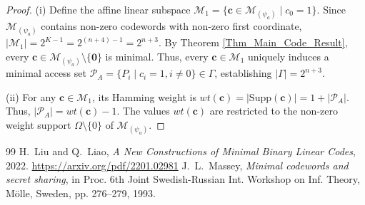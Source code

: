 \documentclass[10pt,a4paper]{amsart}
\begin{document}
\begin{proof}
(i) Define the affine linear subspace $\mathcal{M}_1 = \{\mathbf{c} \in \mathcal{M}_{(\psi_a)} \mid c_0 = 1\}$. Since $\mathcal{M}_{(\psi_a)}$ contains non-zero codewords with non-zero first coordinate, $|\mathcal{M}_1| = 2^{K-1} = 2^{(n+4)-1} = 2^{n+3}$. By Theorem \ref{Thm_Main_Code_Result}, every $\mathbf{c} \in \mathcal{M}_{(\psi_a)} \setminus \{\mathbf{0}\}$ is minimal. Thus, every $\mathbf{c} \in \mathcal{M}_1$ uniquely induces a minimal access set $\mathcal{P}_A = \{P_i \mid c_i = 1, i \neq 0\} \in \Gamma$, establishing $|\Gamma| = 2^{n+3}$.

(ii) For any $\mathbf{c} \in \mathcal{M}_1$, its Hamming weight is $wt(\mathbf{c}) = |\mathrm{Supp}(\mathbf{c})| = 1 + |\mathcal{P}_A|$. Thus, $|\mathcal{P}_A| = wt(\mathbf{c}) - 1$. The values $wt(\mathbf{c})$ are restricted to the non-zero weight support $\Omega \setminus \{0\}$ of $\mathcal{M}_{(\psi_a)}$.
\end{proof}


\begin{thebibliography}{99}
 H.~Liu and Q.~Liao, \textit{A New Constructions of Minimal Binary Linear Codes}, 2022. \url{https://arxiv.org/pdf/2201.02981}
 J.~L.~Massey, \textit{Minimal codewords and secret sharing}, in Proc. 6th Joint Swedish-Russian Int. Workshop on Inf. Theory, M\"olle, Sweden, pp. 276--279, 1993.
\end{thebibliography}
\end{document}
